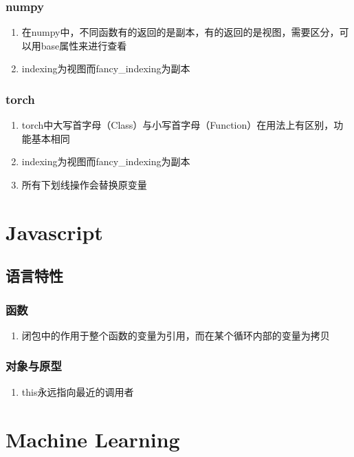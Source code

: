 \documentclass[onecolumn]{article}
\begin{document}
        \subsubsection{numpy}
            \noindent
            \begin{enumerate}
                \item 在numpy中，不同函数有的返回的是副本，有的返回的是视图，需要区分，可以用base属性来进行查看
                \item indexing为视图而fancy\_indexing为副本
            \end{enumerate}
        \subsubsection{torch}
            \noindent
            \begin{enumerate}
                \item torch中大写首字母（Class）与小写首字母（Function）在用法上有区别，功能基本相同
                \item indexing为视图而fancy\_indexing为副本
                \item 所有下划线操作会替换原变量
            \end{enumerate}
\newpage
\section{Javascript}
    \subsection{语言特性}
        \subsubsection{函数}
            \noindent
            \begin{enumerate}
                \item 闭包中的作用于整个函数的变量为引用，而在某个循环内部的变量为拷贝
            \end{enumerate}
        \subsubsection{对象与原型}
            \noindent
            \begin{enumerate}
                \item this永远指向最近的调用者
            \end{enumerate}
\newpage
\section{Machine Learning}
\end{document}
